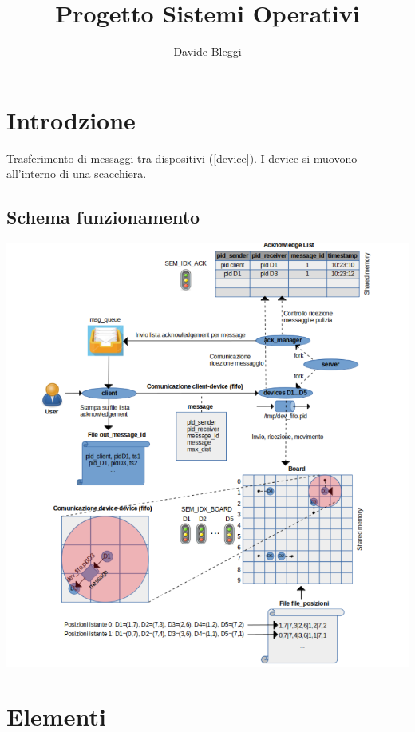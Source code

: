 \documentclass[10pt,a4paper]{article}
\title{Progetto Sistemi Operativi}
\author{Davide Bleggi}
\begin{document}
\maketitle
\newpage
\section{Introdzione}
Trasferimento di messaggi tra dispositivi (\ref{device}). I device si muovono all'interno di una scacchiera.
\subsection{Schema funzionamento}
\includegraphics[scale=1.5]{schema}

\section{Elementi}
\end{document}
